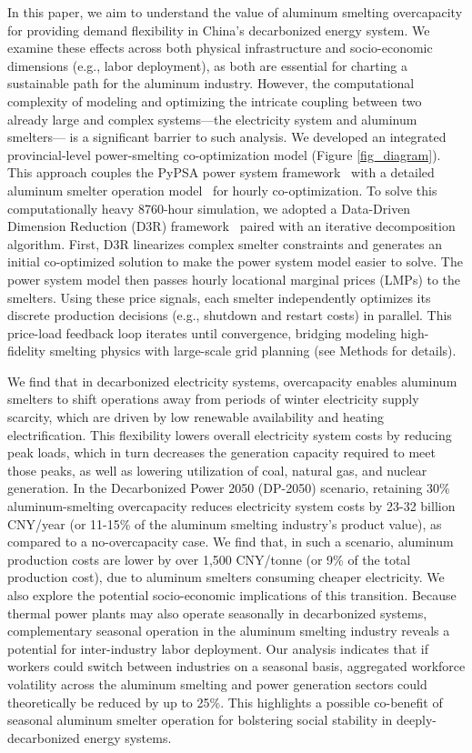 \documentclass[preprint]{elsarticle}
\begin{document}
In this paper, we aim to understand the value of aluminum smelting overcapacity for providing demand flexibility in China's decarbonized energy system. We examine these effects across both physical infrastructure and socio-economic dimensions (e.g., labor deployment), as both are essential for charting a sustainable path for the aluminum industry. However, the computational complexity of modeling and optimizing the intricate coupling between two already large and complex systems—the electricity system and aluminum smelters— is a significant barrier to such analysis.
We developed an integrated provincial-level power-smelting co-optimization model (Figure \ref{fig_diagram}). This approach couples the PyPSA power system framework~\citep{PyPSA} with a detailed aluminum smelter operation model~\citep{shen_improved_2025} for hourly co-optimization. To solve this computationally heavy 8760-hour simulation, we adopted a Data-Driven Dimension Reduction (D3R) framework~\citep{lyu_data-driven_2025} paired with an iterative decomposition algorithm. First, D3R linearizes complex smelter constraints and generates an initial co-optimized solution to make the power system model easier to solve. The power system model then passes hourly locational marginal prices (LMPs) to the smelters. Using these price signals, each smelter independently optimizes its discrete production decisions (e.g., shutdown and restart costs) in parallel. This price-load feedback loop iterates until convergence, bridging modeling high-fidelity smelting physics with large-scale grid planning (see Methods for details).

We find that in decarbonized electricity systems, overcapacity enables aluminum smelters to shift operations away from periods of winter electricity supply scarcity, which are driven by low renewable availability and heating electrification. This flexibility lowers overall electricity system costs by reducing peak loads, which in turn decreases the generation capacity required to meet those peaks, as well as lowering utilization of coal, natural gas, and nuclear generation. In the Decarbonized Power 2050 (DP-2050) scenario, retaining 30\% aluminum-smelting overcapacity reduces electricity system costs by 23-32 billion CNY/year (or 11-15\% of the aluminum smelting industry's product value), as compared to a no-overcapacity case. We find that, in such a scenario, aluminum production costs are lower by over 1,500 CNY/tonne (or 9\% of the total production cost), due to aluminum smelters consuming cheaper electricity.
We also explore the potential socio-economic implications of this transition. Because thermal power plants may also operate seasonally in decarbonized systems, complementary seasonal operation in the aluminum smelting industry reveals a potential for inter-industry labor deployment. Our analysis indicates that if workers could switch between industries on a seasonal basis, aggregated workforce volatility across the aluminum smelting and power generation sectors could theoretically be reduced by up to 25\%. This highlights a possible co-benefit of seasonal aluminum smelter operation for bolstering social stability in deeply-decarbonized energy systems.
\end{document}
